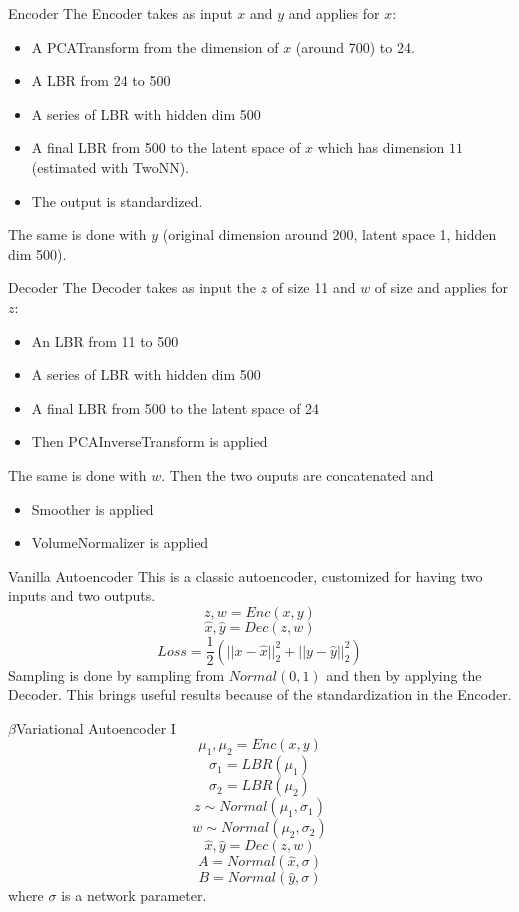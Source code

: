 \documentclass{beamer}
\begin{document}
\begin{frame}{Encoder}
The Encoder takes as input $x$ and $y$ and applies for $x$:
\begin{itemize}
\item A PCATransform from the dimension of $x$ (around 700) to 24.
\item A LBR from 24 to 500
\item A series of LBR with hidden dim 500
\item A final LBR from 500 to the latent space of $x$ which has dimension $11$ (estimated with TwoNN). 
\item The output is standardized.
\end{itemize}
The same is done with $y$ (original dimension around 200,  latent space 1, hidden dim 500).
\end{frame}
\begin{frame}{Decoder}
The Decoder takes as input the  $z$ of size 11 and $w$ of size and applies for $z$:
\begin{itemize}
\item An  LBR from 11 to 500
\item A series of LBR with hidden dim 500
\item A final LBR from 500 to the latent space of 24
\item Then PCAInverseTransform is applied
\end{itemize}
The same is done with $w$. 
Then the two ouputs are concatenated and 
\begin{itemize}
\item Smoother is applied
\item VolumeNormalizer is applied
\end{itemize}
\end{frame}
\begin{frame}{Vanilla Autoencoder}
This is a classic autoencoder, customized for having two inputs and two outputs.
$$z,w=Enc(x,y)$$
$$\hat{x},\hat{y}=Dec(z,w)$$
$$Loss=\frac{1}{2}(||x-\hat{x}||_{2}^{2}+||y-\hat{y}||_{2}^{2})$$
Sampling is done by sampling from $Normal(0,1)$  and then by applying the Decoder. This brings useful results because of the standardization in the Encoder.
\end{frame}
\begin{frame}{$\beta$Variational Autoencoder I}
$$\mu_{1},\mu_{2}=Enc(x,y)$$
$$\sigma_{1}=LBR(\mu_{1})$$
$$\sigma_{2}=LBR(\mu_{2})$$
$$z\sim Normal(\mu_{1},\sigma_{1})$$
$$w\sim Normal(\mu_{2},\sigma_{2})$$
$$\hat{x},\hat{y}=Dec(z,w)$$
$$A=Normal(\hat{x},\sigma)$$
$$B=Normal(\hat{y},\sigma)$$
where $\sigma$ is a network parameter.
\end{frame}
\end{document}
